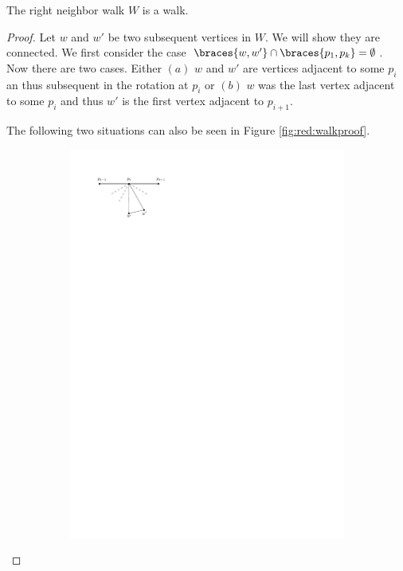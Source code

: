   \begin{lemma}
    \label{lm:red:neighborWalk}
    The right neighbor walk $W$ is a walk.
  \end{lemma}
  \begin{proof}
    Let $w$ and $w'$ be two subsequent vertices in $W$. We will show they are connected. We first consider the case $\braces{w, w'} \cap \braces{p_1, p_k } = \emptyset$.
    Now there are two cases. Either $(a)$ $w$ and $w'$ are vertices adjacent to some $p_i$ an thus subsequent in the rotation at $p_i$  or $(b)$ $w$ was the last vertex adjacent to some $p_i$ and thus $w'$ is the first vertex adjacent to $p_{i+1}$.

    The following two situations can also be seen in Figure \ref{fig:red:walkproof}.

    \begin{figure}[h]
        \centering
        \begin{subfigure}[b]{0.5\linewidth}
            \includegraphics[width=\linewidth]{redAlgo/img/walkProofA}

\end{subfigure}
\end{figure}
\end{proof}
